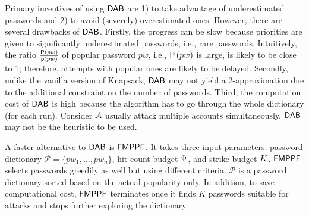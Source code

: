 Primary incentives of using $\mathsf{DAB}$ are 1) to take advantage of underestimated passwords and 2) to avoid (severely) overestimated ones. However, there are several drawbacks of $\mathsf{DAB}$. Firstly, the progress can be slow because priorities are given to significantly underestimated passwords, i.e., rare passwords. Intuitively, the ratio $\frac{\mathsf{P}\left(pw\right)}{\textsf{p}(pw)}$ of popular password $pw$, i.e., $\mathsf{P}\left(pw\right)$ is large, is likely to be close to 1; therefore, attempts with popular ones are likely to be delayed. Secondly, unlike the vanilla version of Knapsack, $\mathsf{DAB}$ may not yield a 2-approximation due to the additional constraint on the number of passwords. Third, the computation cost of $\mathsf{DAB}$ is high because the algorithm has to go through the whole dictionary (for each run). Consider $\mathcal{A}$ usually attack multiple accounts simultaneously, $\mathsf{DAB}$ may not be the heuristic to be used.




A faster alternative to $\mathsf{DAB}$ is $\mathsf{FMPPF}$.  It takes three input parameters: password dictionary $\mathcal{P} = \{pw_1, \ldots, pw_{n} \}$, hit count budget $\Psi$, and strike budget $K$. $\mathsf{FMPPF}$ selects passwords greedily as well but using different criteria. $\mathcal{P}$ is a password dictionary sorted based on the actual popularity only. In addition, to save computational cost, $\mathsf{FMPPF}$ terminates once it finds $K$ passwords suitable for attacks and stops further exploring the dictionary.

